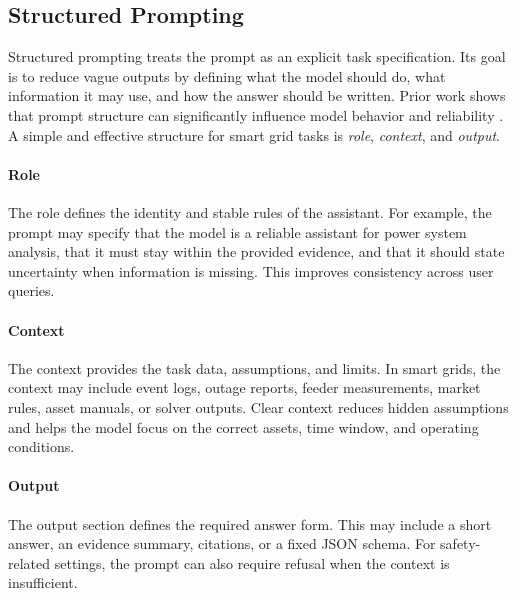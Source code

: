 \documentclass[journal,onecolumn]{IEEEtran} %
\begin{document}

\subsection{Structured Prompting}
Structured prompting treats the prompt as an explicit task specification. Its goal is to reduce vague outputs by defining what the model should do, what information it may use, and how the answer should be written. Prior work shows that prompt structure can significantly influence model behavior and reliability \cite{brown2020language,liu2023pretrain,schulhoff2024prompt}. A simple and effective structure for smart grid tasks is \emph{role}, \emph{context}, and \emph{output}.

\paragraph{Role}
The role defines the identity and stable rules of the assistant. For example, the prompt may specify that the model is a reliable assistant for power system analysis, that it must stay within the provided evidence, and that it should state uncertainty when information is missing. This improves consistency across user queries.

\paragraph{Context}
The context provides the task data, assumptions, and limits. In smart grids, the context may include event logs, outage reports, feeder measurements, market rules, asset manuals, or solver outputs. Clear context reduces hidden assumptions and helps the model focus on the correct assets, time window, and operating conditions.

\paragraph{Output}
The output section defines the required answer form. This may include a short answer, an evidence summary, citations, or a fixed JSON schema. For safety-related settings, the prompt can also require refusal when the context is insufficient.
\end{document}

